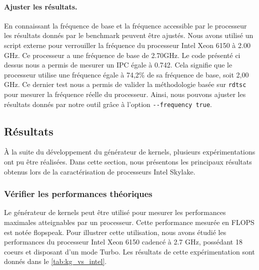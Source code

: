     
    
        \paragraph{Ajuster les résultats.} En connaissant la fréquence de base et la fréquence accessible par le processeur les résultats donnés par le benchmark peuvent être ajustés. Nous avons utilisé un script externe pour verrouiller la fréquence du processeur Intel Xeon 6150 à 2.00 GHz. Ce processeur a une fréquence de base de 2.70GHz. Le code présenté ci dessus nous a permis de mesurer un \gls{IPC} égale à 0.742. Cela signifie que le processeur utilise une fréquence égale à 74,2\% de sa fréquence de base, soit 2,00 GHz. Ce dernier test nous a permis de valider la méthodologie basée sur \verb|rdtsc| pour mesurer la fréquence réelle du processeur. Ainsi, nous pouvons ajuster les résultats donnés par notre outil grâce à l'option \verb|--frequency true|.

    
\subsection{Résultats}
    À la suite du développement du générateur de \glspl{kernel}, plusieurs expérimentations ont pu être réalisées. Dans cette section, nous présentons les principaux résultats obtenus lors de la caractérisation de processeurs Intel Skylake.
   
   
   

    \subsubsection{Vérifier les performances théoriques}
    Le générateur de kernels peut être utilisé pour mesurer les performances maximales atteignables par un processeur. Cette performance mesurée en \gls{FLOPS} est notée \gls{flopspeak}. Pour illustrer cette utilisation, nous avons étudié les performances du processeur Intel Xeon 6150 cadencé à 2.7 GHz, possédant 18 coeurs et disposant d'un mode Turbo. Les résultats de cette expérimentation sont donnés dans le \autoref{tab:kg_vs_intel}. 
    
